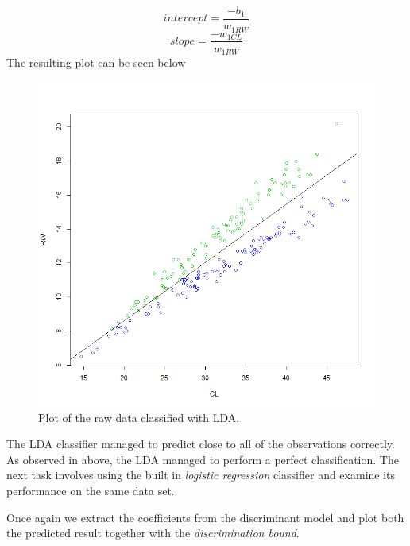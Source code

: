 \documentclass[a4paper,12pt]{article}
\begin{document}
\begin{equation}
  intercept = \frac{-b_1}{w_{1RW}}
\end{equation}
\begin{equation}
  slope = \frac{-w_{1CL}}{w_{1RW}}
\end{equation}
The resulting plot can be seen below
\begin{figure}[H]
\centering
\begin{minipage}[]{0.5\textwidth}
  \includegraphics[width=\textwidth]{figures/lda_plot.png}  
  \caption{Plot of the raw data classified with LDA.\label{fig:lda_plot}}
 \end{minipage}
\end{figure}
The LDA classifier managed to predict close to all of the observations correctly. As observed in above, the LDA managed to perform a perfect classification. The next task involves using the built in \textit{logistic regression} classifier and examine its performance on the same data set.

Once again we extract the coefficients from the discriminant model and plot both the predicted result together with the \textit{discrimination bound}.
\end{document}
